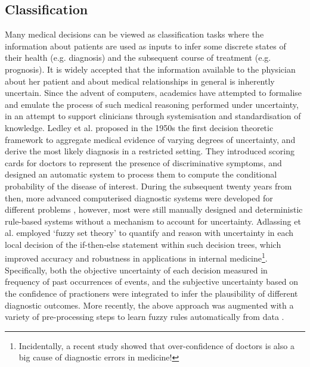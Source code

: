 \subsection*{Classification} 
Many medical decisions can be viewed as classification tasks where the information about patients are used as inputs to infer some discrete states of their health (e.g. diagnosis) and the subsequent course of treatment (e.g. prognosis). It is widely accepted that the information available to the physician about her patient and about medical relationships in general is inherently uncertain. Since the advent of computers, academics have attempted to formalise and emulate the process of such medical reasoning performed under uncertainty,  in an attempt to support clinicians through systemisation and standardisation of knowledge. Ledley et al. \cite{ledley1959reasoning} proposed in the 1950s the first decision theoretic framework to aggregate medical evidence of varying degrees of uncertainty, and derive the most likely diagnosis in a restricted setting. They introduced scoring cards for doctors to represent the presence of discriminative symptoms, and designed an automatic system to process them to compute the conditional probability of the disease of interest. During the subsequent twenty years from then, more advanced computerised diagnostic systems were developed for different problems \cite{shortliffe1979knowledge,kulikowski1980artificial,duda1983expert}, however, most were still manually designed and deterministic rule-based systems without a mechanism to account for uncertainty. Adlassing et al. \cite{adlassnig1985cadiag,adlassnig1986fuzzy} employed `fuzzy set theory' to quantify and reason with uncertainty in each local decision of the if-then-else statement within such decision trees, which improved accuracy and robustness in applications in internal medicine\footnote{Incidentally, a recent study \cite{berner2008overconfidence} showed that over-confidence of doctors is also a big cause of diagnostic errors in medicine!}. Specifically, both the objective uncertainty of each decision measured in frequency of past occurrences of events, and the subjective uncertainty based on the confidence of practioners were integrated to infer the plausibility of different diagnostic outcomes. More recently, the above approach was augmented with a variety of pre-processing steps to learn fuzzy rules automatically from data \cite{steimann1998fuzzy,john2005modeling,straszecka2006combining,anooj2012clinical,tsipouras2008automated}. 

